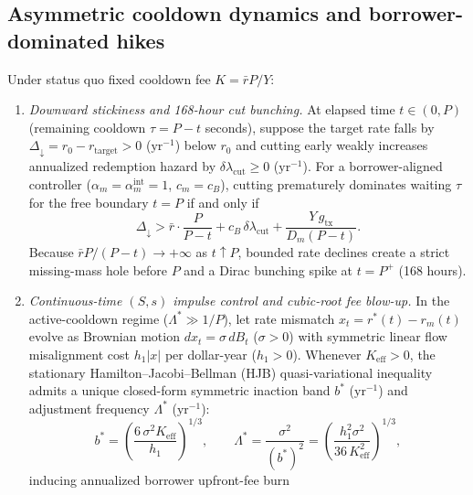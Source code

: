 \subsection{Asymmetric cooldown dynamics and borrower-dominated hikes}\label{subsec:impulse}

\begin{theorem}\label{thm:agency_impulse}
Under status quo fixed cooldown fee $K = \bar{r}P/Y$:
\begin{enumerate}[label=(\roman*), leftmargin=2.2em, itemsep=2pt]
\item \emph{Downward stickiness and 168-hour cut bunching.} At elapsed time $t \in (0, P)$ (remaining cooldown $\tau = P - t$ seconds), suppose the target rate falls by $\Delta_\downarrow = r_0 - r_{\mathrm{target}} > 0$ ($\mathrm{yr}^{-1}$) below $r_0$ and cutting early weakly increases annualized redemption hazard by $\delta\lambda_{\mathrm{cut}} \ge 0$ ($\mathrm{yr}^{-1}$). For a borrower-aligned controller ($\alpha_m = \alpha_m^{\mathrm{int}} = 1$, $c_m = c_B$), cutting prematurely dominates waiting $\tau$ for the free boundary $t = P$ if and only if
\begin{equation}\label{eq:cut_bunch}
\Delta_\downarrow > \bar{r}\cdot\frac{P}{P - t} + c_B\,\delta\lambda_{\mathrm{cut}} + \frac{Y\,g_{\mathrm{tx}}}{D_m(P - t)}.
\end{equation}
Because $\bar{r}P/(P - t) \to +\infty$ as $t \uparrow P$, bounded rate declines create a strict missing-mass hole before $P$ and a Dirac bunching spike at $t = P^+$ (168 hours).
\item \emph{Continuous-time $(S,s)$ impulse control and cubic-root fee blow-up.} In the active-cooldown regime ($\Lambda^* \gg 1/P$), let rate mismatch $x_t = r^*(t) - r_m(t)$ evolve as Brownian motion $dx_t = \sigma\,dB_t$ ($\sigma > 0$) with symmetric linear flow misalignment cost $h_1|x|$ per dollar-year ($h_1 > 0$). Whenever $K_{\mathrm{eff}} > 0$, the stationary Hamilton--Jacobi--Bellman (HJB) quasi-variational inequality admits a unique closed-form symmetric inaction band $b^*$ ($\mathrm{yr}^{-1}$) and adjustment frequency $\Lambda^*$ ($\mathrm{yr}^{-1}$):
\begin{equation}\label{eq:hjb_band}
b^* = \left(\frac{6\,\sigma^2 K_{\mathrm{eff}}}{h_1}\right)^{1/3}, \qquad \Lambda^* = \frac{\sigma^2}{(b^*)^2} = \left(\frac{h_1^2 \sigma^2}{36\,K_{\mathrm{eff}}^2}\right)^{1/3},
\end{equation}
inducing annualized borrower upfront-fee burn

\end{enumerate}
\end{theorem}
